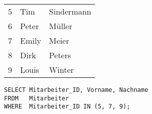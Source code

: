           \begin{center}
            \begin{small}
              \tablehead{}
              \begin{msoraclesql}
                \begin{supertabular}{rll}
                5 & Tim & Sindermann \\
                6 & Peter & M\"uller \\
                7 & Emily & Meier \\
                8 & Dirk & Peters \\
                9 & Louis & Winter \\
                \end{supertabular}
              \end{msoraclesql}
            \end{small}
          \end{center}
          \begin{lstlisting}[language=oracle_sql,caption={Alle Zeilen aus einer Wertemenge anzeigen},label=sql02_05]
SELECT Mitarbeiter_ID, Vorname, Nachname
FROM   Mitarbeiter
WHERE  Mitarbeiter_ID IN (5, 7, 9);
          \end{lstlisting}
